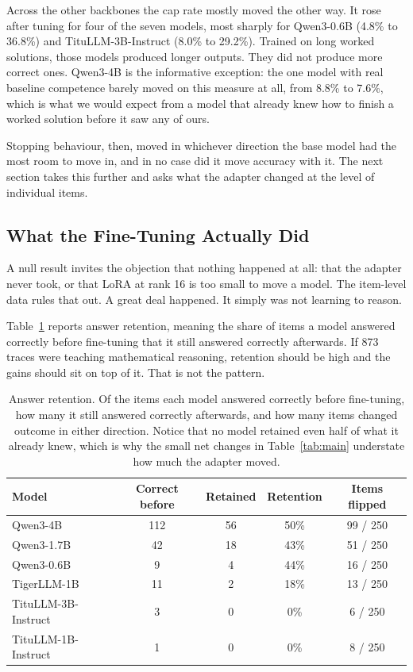 Across the other backbones the cap rate mostly moved the other way. It rose
after tuning for four of the seven models, most sharply for Qwen3-0.6B (4.8\%
to 36.8\%) and TituLLM-3B-Instruct (8.0\% to 29.2\%). Trained on long worked
solutions, those models produced longer outputs. They did not produce more
correct ones. Qwen3-4B is the informative exception: the one model with real
baseline competence barely moved on this measure at all, from 8.8\% to 7.6\%,
which is what we would expect from a model that already knew how to finish a
worked solution before it saw any of ours.

Stopping behaviour, then, moved in whichever direction the base model had the
most room to move in, and in no case did it move accuracy with it. The next
section takes this further and asks what the adapter changed at the level of
individual items.

\subsection{What the Fine-Tuning Actually Did}
\label{sec:retention}

A null result invites the objection that nothing happened at all: that the
adapter never took, or that LoRA at rank 16 is too small to move a model. The
item-level data rules that out. A great deal happened. It simply was not
learning to reason.

Table~\ref{tab:retention} reports answer retention, meaning the share of items
a model answered correctly before fine-tuning that it still answered correctly
afterwards. If 873 traces were teaching mathematical reasoning, retention
should be high and the gains should sit on top of it. That is not the pattern.

\begin{table}[htbp]
\caption{Answer retention. Of the items each model answered correctly
before fine-tuning, how many it still answered correctly afterwards, and
how many items changed outcome in either direction. Notice that no model
retained even half of what it already knew, which is why the small net
changes in Table~\ref{tab:main} understate how much the adapter moved.}
\label{tab:retention}
\centering\small
\begin{tabular}{|l|c|c|c|c|}
\hline
\textbf{Model} & \textbf{Correct before} & \textbf{Retained} & \textbf{Retention} & \textbf{Items flipped} \\
\hline
Qwen3-4B & 112 & 56 & 50\% & 99 / 250 \\
Qwen3-1.7B & 42 & 18 & 43\% & 51 / 250 \\
Qwen3-0.6B & 9 & 4 & 44\% & 16 / 250 \\
TigerLLM-1B & 11 & 2 & 18\% & 13 / 250 \\
TituLLM-3B-Instruct & 3 & 0 & 0\% & 6 / 250 \\
TituLLM-1B-Instruct & 1 & 0 & 0\% & 8 / 250 \\
\hline
\end{tabular}
\end{table}

